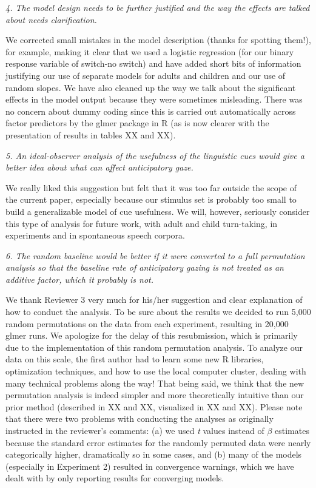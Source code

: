 \documentclass[11pt,a4paper]{letter} %
\begin{document}
\begin{letter}{}
\smallskip

\noindent \textit{4. The model design needs to be further justified and the way the effects are talked about needs clarification.}

\noindent We corrected small mistakes in the model description (thanks for spotting them!), for example, making it clear that we used a logistic regression (for our binary response variable of switch-no switch) and have added short bits of information justifying our use of separate models for adults and children and our use of random slopes. We have also cleaned up the way we talk about the significant effects in the model output because they were sometimes misleading. There was no concern about dummy coding since this is carried out automatically across factor predictors by the glmer package in R (as is now clearer with the presentation of results in tables XX and XX).

\smallskip

\noindent \textit{5. An ideal-observer analysis of the usefulness of the linguistic cues would give a better idea about what can affect anticipatory gaze.}

\noindent We really liked this suggestion but felt that it was too far outside the scope of the current paper, especially because our stimulus set is probably too small to build a generalizable model of cue usefulness. We will, however, seriously consider this type of analysis for future work, with adult and child turn-taking, in experiments and in spontaneous speech corpora. 

\smallskip

\noindent \textit{6. The random baseline would be better if it were converted to a full permutation analysis so that the baseline rate of anticipatory gazing is not treated as an additive factor, which it probably is not.}

\noindent We thank Reviewer 3 very much for his/her suggestion and clear explanation of how to conduct the analysis. To be sure about the results we decided to run 5,000 random permutations on the data from each experiment, resulting in 20,000 glmer runs. We apologize for the delay of this resubmission, which is primarily due to the implementation of this random permutation analysis. To analyze our data on this scale, the first author had to learn some new R libraries, optimization techniques, and how to use the local computer cluster, dealing with many technical problems along the way! That being said, we think that the new permutation analysis is indeed simpler and more theoretically intuitive than our prior method (described in XX and XX, visualized in XX and XX). Please note that there were two problems with conducting the analyses as originally instructed in the reviewer's comments: (a) we used \textit{t} values instead of \textit{$\beta$} estimates because the standard error estimates for the randomly permuted data were nearly categorically higher, dramatically so in some cases, and (b) many of the models (especially in Experiment 2) resulted in convergence warnings, which we have dealt with by only reporting results for converging models.


\end{letter}
\end{document}
